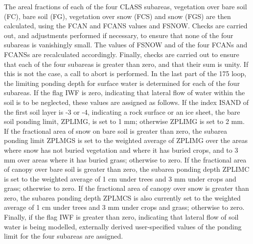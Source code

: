 The areal fractions of each of the four C\+L\+A\+S\+S subareas, vegetation over bare soil (F\+C), bare soil (F\+G), vegetation over snow (F\+C\+S) and snow (F\+G\+S) are then calculated, using the F\+C\+A\+N and F\+C\+A\+N\+S values and F\+S\+N\+O\+W. Checks are carried out, and adjustments performed if necessary, to ensure that none of the four subareas is vanishingly small. The values of F\+S\+N\+O\+W and of the four F\+C\+A\+Ns and F\+C\+A\+N\+Ss are recalculated accordingly. Finally, checks are carried out to ensure that each of the four subareas is greater than zero, and that their sum is unity. If this is not the case, a call to abort is performed. In the last part of the 175 loop, the limiting ponding depth for surface water is determined for each of the four subareas. If the flag I\+W\+F is zero, indicating that lateral flow of water within the soil is to be neglected, these values are assigned as follows. If the index I\+S\+A\+N\+D of the first soil layer is -\/3 or -\/4, indicating a rock surface or an ice sheet, the bare soil ponding limit, Z\+P\+L\+I\+M\+G, is set to 1 mm; otherwise Z\+P\+L\+I\+M\+G is set to 2 mm. If the fractional area of snow on bare soil is greater than zero, the subarea ponding limit Z\+P\+L\+M\+G\+S is set to the weighted average of Z\+P\+L\+I\+M\+G over the areas where snow has not buried vegetation and where it has buried crops, and to 3 mm over areas where it has buried grass; otherwise to zero. If the fractional area of canopy over bare soil is greater than zero, the subarea ponding depth Z\+P\+L\+I\+M\+C is set to the weighted average of 1 cm under trees and 3 mm under crops and grass; otherwise to zero. If the fractional area of canopy over snow is greater than zero, the subarea ponding depth Z\+P\+L\+M\+C\+S is also currently set to the weighted average of 1 cm under trees and 3 mm under crops and grass; otherwise to zero. Finally, if the flag I\+W\+F is greater than zero, indicating that lateral flow of soil water is being modelled, externally derived user-\/specified values of the ponding limit for the four subareas are assigned.

